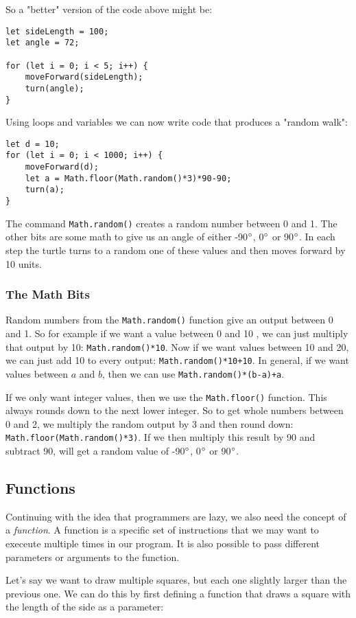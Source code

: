 \documentclass[11pt,a4paper]{report}
\begin{document}
So a "better" version of the code above might be:
\begin{verbatim}
let sideLength = 100;
let angle = 72;

for (let i = 0; i < 5; i++) {
	moveForward(sideLength);
	turn(angle);
}
\end{verbatim}

\newpage
Using loops and variables we can now write code that produces a "random walk": 
\begin{verbatim}
let d = 10;
for (let i = 0; i < 1000; i++) {
    moveForward(d);
    let a = Math.floor(Math.random()*3)*90-90;
    turn(a);
}
\end{verbatim}
The command \verb|Math.random()| creates a random number between 0 and 1. The other bits are some math to give us an angle of either -90$^\circ$, 0$^\circ$ or 90$^\circ$.  In each step the turtle turns to a random one of these values and then moves forward by 10 units. 

\subsubsection{The Math Bits}
Random numbers from the \verb|Math.random()| function give an output between 0 and 1. So for example if we want a value between 0 and 10 , we can just multiply that output by 10: \verb|Math.random()*10|. Now if we want values between 10 and 20, we can just add 10 to every output: \verb|Math.random()*10+10|. In general, if we want values between $a$ and $b$, then we can use \verb|Math.random()*(b-a)+a|.

If we only want integer values, then we use the \verb|Math.floor()| function. This always rounds down to the next lower integer. So to get whole numbers between 0 and 2, we multiply the random output by 3 and then round down: \verb|Math.floor(Math.random()*3)|. If we then multiply this result by 90 and subtract 90, will get a random value of -90$^\circ$, 0$^\circ$ or 90$^\circ$.

\subsection{Functions}

Continuing with the idea that programmers are lazy, we also need the concept of a \emph{function}. A function is a specific set of instructions that we may want to execeute multiple times in our program. It is also possible to pass different parameters or arguments to the function.

Let's say we want to draw multiple squares, but each one slightly larger than the previous one. We can do this by first defining a function that draws a square with the length of the side as a parameter: 
\end{document}
